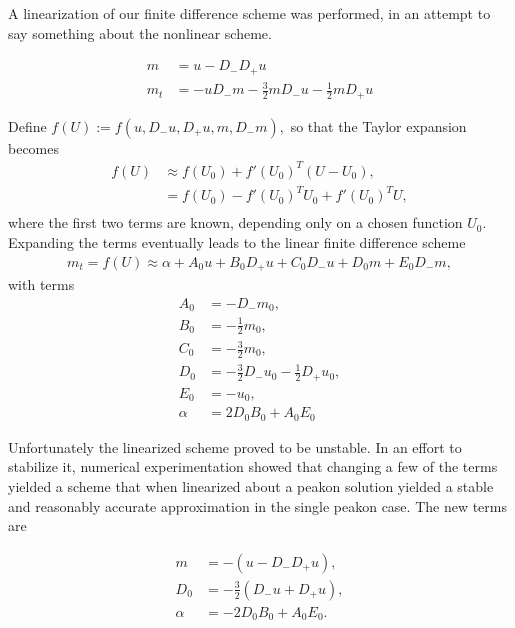 A linearization of our finite difference scheme was performed, in an attempt to say something about the nonlinear scheme. 

\begin{align}
m &= u - D_{-} D_{+} u \\
m_{t} &= -uD_{-}m - \frac{3}{2}mD_{-}u - \frac{1}{2}mD_{+}u
\end{align} 

Define $f(U) := f(u, D_{-}u, D_{+}u, m, D_{-}m),$ so that the Taylor expansion becomes
\begin{align}
f(U) &\approx f(U_{0}) + f'(U_{0})^{T}(U-U_{0}),\\
&= f(U_{0}) - f'(U_{0})^{T}U_{0} + f'(U_{0})^{T}U, \\
\end{align}
where the first two terms are known, depending only on a chosen function $U_{0}$. Expanding the terms eventually leads to the linear finite difference scheme
\begin{align}
m_{t} = f(U) \approx \alpha + A_{0}u + B_{0}D_{+}u + C_{0}D_{-}u + D_{0}m + E_{0}D_{-}m,
\end{align}
with terms
\begin{align}
A_{0} &= -D_{-}m_{0}, \\
B_{0} &= - \frac{1}{2}m_{0}, \\
C_{0} &= - \frac{3}{2}m_{0}, \\
D_{0} &= - \frac{3}{2}D_{-}u_{0} - \frac{1}{2}D_{+}u_{0}, \\
E_{0} &= - u_{0}, \\
\alpha &= 2 D_0 B_0 + A_0 E_0
\end{align}

Unfortunately the linearized scheme proved to be unstable. In an effort to stabilize it, numerical experimentation showed that changing a few of the terms yielded a scheme that when linearized about a peakon solution yielded a stable and reasonably accurate approximation in the single peakon case. The new terms are

\begin{align}
m &= -(u - D_{-}D_{+}u), \\
D_{0} &= -\frac{3}{2}(D_{-}u + D_{+}u), \\
\alpha &= -2D_{0}B_{0} + A_{0}E_{0}.
\end{align}